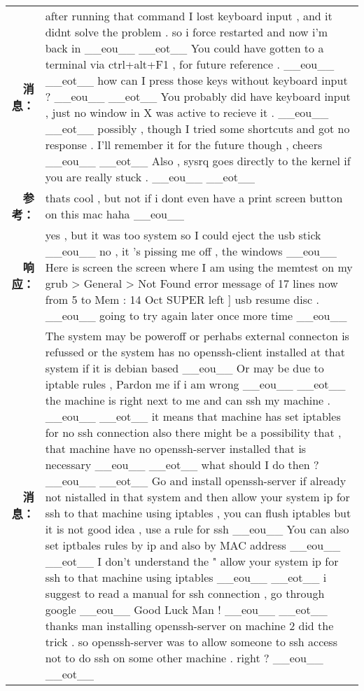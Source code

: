 \begin{tabularx}{0.8\textwidth}{@{}rX@{}}%
\toprule%
\midrule%
\textbf{消息：}&after running that command I lost keyboard input , and it didnt solve the problem . so i force restarted and now i'm back in \_\_eou\_\_ \_\_eot\_\_ You could have gotten to a terminal via ctrl+alt+F1 , for future reference . \_\_eou\_\_ \_\_eot\_\_ how can I press those keys without keyboard input ? \_\_eou\_\_ \_\_eot\_\_ You probably did have keyboard input , just no window in X was active to recieve it . \_\_eou\_\_ \_\_eot\_\_ possibly , though I tried some shortcuts and got no response . I'll remember it for the future though , cheers \_\_eou\_\_ \_\_eot\_\_ Also , sysrq goes directly to the kernel if you are really stuck . \_\_eou\_\_ \_\_eot\_\_\\%
\textbf{参考：}&thats cool , but not if i dont even have a print screen button on this mac haha \_\_eou\_\_\\%
\textbf{响应：}&yes , but it was too system so I could eject the usb stick \_\_eou\_\_ no , it 's pissing me off , the windows \_\_eou\_\_ Here is screen the screen where I am using the memtest on my grub > General > Not Found error message of 17 lines now from 5 to Mem : 14 Oct SUPER left {]} usb resume disc . \_\_eou\_\_ going to try again later once more time \_\_eou\_\_\\%
\midrule%
\textbf{消息：}&The system may be poweroff or perhabs external connecton is refussed or the system has no openssh{-}client installed at that system if it is debian based \_\_eou\_\_ Or may be due to iptable rules , Pardon me if i am wrong \_\_eou\_\_ \_\_eot\_\_ the machine is right next to me and can ssh my machine . \_\_eou\_\_ \_\_eot\_\_ it means that machine has set iptables for no ssh connection also there might be a possibility that , that machine have no openssh{-}server installed that is necessary \_\_eou\_\_ \_\_eot\_\_ what should I do then ? \_\_eou\_\_ \_\_eot\_\_ Go and install openssh{-}server if already not nistalled in that system and then allow your system ip for ssh to that machine using iptables , you can flush iptables but it is not good idea , use a rule for ssh \_\_eou\_\_ You can also set iptbales rules by ip and also by MAC address \_\_eou\_\_ \_\_eot\_\_ I don't understand the " allow your system ip for ssh to that machine using iptables \_\_eou\_\_ \_\_eot\_\_ i suggest to read a manual for ssh connection , go through google \_\_eou\_\_ Good Luck Man ! \_\_eou\_\_ \_\_eot\_\_ thanks man installing openssh{-}server on machine 2 did the trick . so openssh{-}server was to allow someone to ssh access not to do ssh on some other machine . right ? \_\_eou\_\_ \_\_eot\_\_\\%

\end{tabularx}
